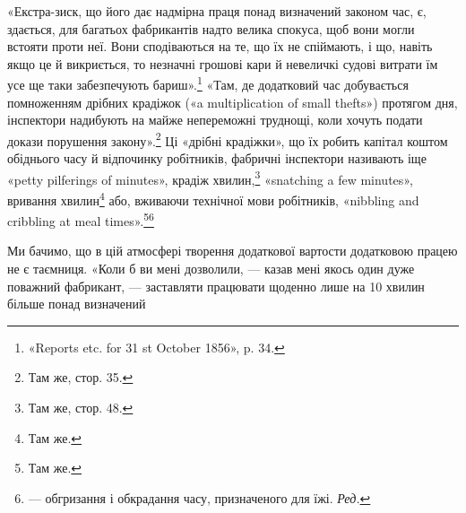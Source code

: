 «Екстра-зиск, що його дає надмірна праця понад визначений
законом час, є, здається, для багатьох фабрикантів надто
велика спокуса, щоб вони могли встояти проти неї. Вони сподіваються
на те, що їх не спіймають, і що, навіть якщо це й
викриється, то незначні грошові кари й невеличкі судові витрати
їм усе ще таки забезпечують бариш».\footnote{
«Reports etc. for 31 st October 1856», p. 34.
} «Там, де додатковий
час добувається помноженням дрібних крадіжок («a multiplication
of small thefts») протягом дня, інспектори надибують на
майже непереможні труднощі, коли хочуть подати докази порушення
закону».\footnote{
Там же, стор. 35.
} Ці «дрібні крадіжки», що їх робить капітал
коштом обіднього часу й відпочинку робітників, фабричні інспектори
називають іще «petty pilferings of minutes», крадіж хвилин,\footnote{
Там же, стор. 48.
}
«snatching a few minutes», вривання хвилин\footnote{
Там же.
} або, вживаючи технічної
мови робітників, «nibbling and cribbling at meal times».\footnote{
Там же.
}\footnote*{
— обгризання і обкрадання часу, призначеного для їжі. \emph{Ред.}
}

Ми бачимо, що в цій атмосфері творення додаткової вартости
додатковою працею не є таємниця. «Коли б ви мені дозволили, —
казав мені якось один дуже поважний фабрикант, — заставляти
працювати щоденно лише на 10 хвилин більше понад визначений
\parbreak{}  %
